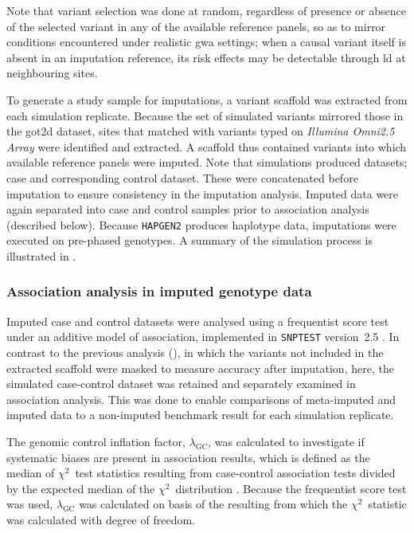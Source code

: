 Note that variant selection was done at random, regardless of presence or absence of the selected variant in any of the available reference panels, so as to mirror conditions encountered under realistic \gls{gwa} settings; \ie when a causal variant itself is absent in an imputation reference, its risk effects may be detectable through \gls{ld} at neighbouring sites.

%

%

To generate a study sample for imputations, a variant scaffold was extracted from each simulation replicate.
Because the set of simulated variants mirrored those in the \gls{got2d} dataset,
sites that matched with variants typed on \emph{Illumina Omni2.5 Array} were identified and extracted.
A scaffold thus contained  variants into which available reference panels were imputed.
Note that simulations produced  datasets;  case and  corresponding control dataset.
These were concatenated before imputation to ensure consistency in the imputation analysis.
Imputed data were again separated into case and control samples prior to association analysis (described below).
Because \texttt{HAPGEN2} produces haplotype data, imputations were executed on pre-phased genotypes.
A summary of the simulation process is illustrated in .



%
\subsubsection{Association analysis in imputed genotype data}
%

Imputed case and control datasets were analysed using a frequentist score test under an additive model of association, implemented in \texttt{SNPTEST} version~2.5 \citep{Marchini:2007bg}.
In contrast to the previous analysis (), in which the variants not included in the extracted scaffold were masked to measure accuracy after imputation, here, the simulated case-control dataset was retained and separately examined in association analysis.
This was done to enable comparisons of meta-imputed and imputed data to a non-imputed benchmark result for each simulation replicate.

The genomic control inflation factor, $\lambda_\text{GC}$, was calculated to investigate if systematic biases are present in association results, which is defined as the median of $\chi^2$~test statistics resulting from case-control association tests divided by the expected median of the $\chi^2$~distribution \citep{Devlin:2001ga}.
Because the frequentist score test was used, $\lambda_\text{GC}$ was calculated on basis of the resulting \pvalues from which the $\chi^2$~statistic was calculated with  degree of freedom.


